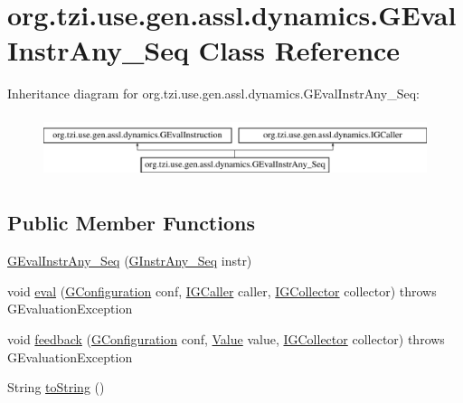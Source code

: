 \hypertarget{classorg_1_1tzi_1_1use_1_1gen_1_1assl_1_1dynamics_1_1_g_eval_instr_any___seq}{\section{org.\-tzi.\-use.\-gen.\-assl.\-dynamics.\-G\-Eval\-Instr\-Any\-\_\-\-Seq Class Reference}
\label{classorg_1_1tzi_1_1use_1_1gen_1_1assl_1_1dynamics_1_1_g_eval_instr_any___seq}
}
Inheritance diagram for org.\-tzi.\-use.\-gen.\-assl.\-dynamics.\-G\-Eval\-Instr\-Any\-\_\-\-Seq\-:\begin{figure}[H]
\begin{center}
\leavevmode
\includegraphics[height=1.866667cm]{classorg_1_1tzi_1_1use_1_1gen_1_1assl_1_1dynamics_1_1_g_eval_instr_any___seq}
\end{center}
\end{figure}
\subsection*{Public Member Functions}
\begin{DoxyCompactItemize}
\item 
\hyperlink{classorg_1_1tzi_1_1use_1_1gen_1_1assl_1_1dynamics_1_1_g_eval_instr_any___seq_ac36a679978b22528725461394ddf7a55}{G\-Eval\-Instr\-Any\-\_\-\-Seq} (\hyperlink{classorg_1_1tzi_1_1use_1_1gen_1_1assl_1_1statics_1_1_g_instr_any___seq}{G\-Instr\-Any\-\_\-\-Seq} instr)
\item 
void \hyperlink{classorg_1_1tzi_1_1use_1_1gen_1_1assl_1_1dynamics_1_1_g_eval_instr_any___seq_ad1907242064a3cdbabd107cf0115ddf9}{eval} (\hyperlink{classorg_1_1tzi_1_1use_1_1gen_1_1assl_1_1dynamics_1_1_g_configuration}{G\-Configuration} conf, \hyperlink{interfaceorg_1_1tzi_1_1use_1_1gen_1_1assl_1_1dynamics_1_1_i_g_caller}{I\-G\-Caller} caller, \hyperlink{interfaceorg_1_1tzi_1_1use_1_1gen_1_1assl_1_1dynamics_1_1_i_g_collector}{I\-G\-Collector} collector)  throws G\-Evaluation\-Exception 
\item 
void \hyperlink{classorg_1_1tzi_1_1use_1_1gen_1_1assl_1_1dynamics_1_1_g_eval_instr_any___seq_a7b39566a5244b94018d6bc8c26e5dbd2}{feedback} (\hyperlink{classorg_1_1tzi_1_1use_1_1gen_1_1assl_1_1dynamics_1_1_g_configuration}{G\-Configuration} conf, \hyperlink{classorg_1_1tzi_1_1use_1_1uml_1_1ocl_1_1value_1_1_value}{Value} value, \hyperlink{interfaceorg_1_1tzi_1_1use_1_1gen_1_1assl_1_1dynamics_1_1_i_g_collector}{I\-G\-Collector} collector)  throws G\-Evaluation\-Exception 
\item 
String \hyperlink{classorg_1_1tzi_1_1use_1_1gen_1_1assl_1_1dynamics_1_1_g_eval_instr_any___seq_a76471abed70cef3b96745d7d7d6e47ba}{to\-String} ()
\end{DoxyCompactItemize}
